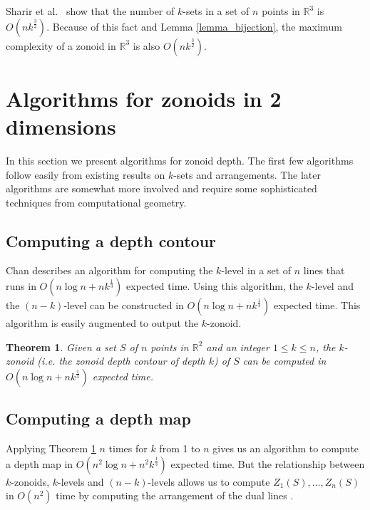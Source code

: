\documentclass[charterfonts,lotsofwhite]{patmorin}
\newtheorem{theorem}{Theorem}
\begin{document}
Sharir et al.\ \cite{an_improved_bound_for_ksets_in_three_dimensions} show that the number of $k$-sets in a set of $n$ points in $\mathbb{R}^3$ is $O(nk^{\frac{3}{2}})$. Because of this fact and Lemma \ref{lemma_bijection}, the maximum complexity of a zonoid in $\mathbb{R}^3$ is also $O(nk^{\frac{3}{2}})$.

\section{Algorithms for zonoids in 2 dimensions}\label{section_algorithms_for_zonoids_in_2_dimensions}

In this section we present algorithms for zonoid depth. The first few
algorithms follow easily from existing results on $k$-sets and
arrangements. The later algorithms are somewhat more involved and
require some sophisticated techniques from computational geometry.

\subsection{Computing a depth contour}\label{subsection_computing_a_depth_countour}

Chan \cite{remarks_on_klevel_algorithms_in_the_plane} describes an algorithm for computing the $k$-level in a set of $n$ lines that runs in $O(n \log n + nk^{\frac{1}{3}})$ expected time. Using this algorithm, the $k$-level and the $(n-k)$-level can be constructed in $O(n \log n + nk^{\frac{1}{3}})$ expected time. This algorithm is easily augmented to output the $k$-zonoid. 

\begin{theorem}\label{theorem_build_k_zonoid}
Given a set $S$ of $n$ points in $\mathbb{R}^2$ and an integer $1 \le k \le n$, the $k$-zonoid (i.e. the zonoid depth contour of depth $k$) of $S$ can be computed in $O(n \log n + nk^{\frac{1}{3}})$ expected time.
\end{theorem}

\subsection{Computing a depth map}\label{subsection_computing_a_depth_map}

Applying Theorem \ref{theorem_build_k_zonoid} $n$ times for $k$ from 1
to $n$ gives us an algorithm to compute a depth map in $O(n^2 \log n +
n^2 k^{\frac{1}{3}})$ expected time. But the relationship between
$k$-zonoids, $k$-levels and $(n-k)$-levels allows us to compute
$Z_1(S),\ldots,Z_n(S)$ in $O(n^2)$ time by computing the arrangement
of the dual lines \cite{edelsbrunner_book}.
\end{document}
